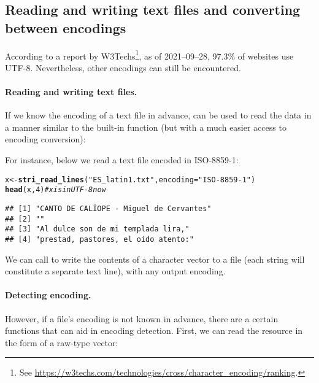 \documentclass[nojss]{jss}\usepackage[]{graphicx}\usepackage[]{xcolor}
\makeatletter
\newcommand{\hlnum}[1]{\textcolor[rgb]{0.686,0.059,0.569}{#1}}%
\newcommand{\hlstr}[1]{\textcolor[rgb]{0.192,0.494,0.8}{#1}}%
\newcommand{\hlcom}[1]{\textcolor[rgb]{0.678,0.584,0.686}{\textit{#1}}}%
\newcommand{\hlstd}[1]{\textcolor[rgb]{0.345,0.345,0.345}{#1}}%
\newcommand{\hlkwb}[1]{\textcolor[rgb]{0.69,0.353,0.396}{#1}}%
\newcommand{\hlkwc}[1]{\textcolor[rgb]{0.333,0.667,0.333}{#1}}%
\newcommand{\hlkwd}[1]{\textcolor[rgb]{0.737,0.353,0.396}{\textbf{#1}}}%
\newenvironment{kframe}{%
 \def\at@end@of@kframe{}%
 \ifinner\ifhmode%
  \def\at@end@of@kframe{\end{minipage}}%
  \begin{minipage}{\columnwidth}%
 \fi\fi%
 \def\FrameCommand##1{\hskip\@totalleftmargin \hskip-\fboxsep
 \colorbox{shadecolor}{##1}\hskip-\fboxsep
     \hskip-\linewidth \hskip-\@totalleftmargin \hskip\columnwidth}%
 \MakeFramed {\advance\hsize-\width
   \@totalleftmargin\z@ \linewidth\hsize
   \@setminipage}}%
 {\par\unskip\endMakeFramed%
 \at@end@of@kframe}
\newenvironment{knitrout}{}{} %
\makeatother
\begin{document}
\subsection{Reading and writing text files and converting between encodings}\label{Sec:read_lines}

According to a report by W3Techs\footnote{See
\url{https://w3techs.com/technologies/cross/character_encoding/ranking}.},
as of 2021--09--28, 97.3\% of websites use UTF-8.
Nevertheless, other encodings can still be encountered.

\paragraph{Reading and writing text files.}
If we know the encoding of a text file  in advance,
 can be used to read
the data in a manner similar to the built-in  function
(but with a much easier access to encoding conversion):

For instance, below we read a text file encoded in ISO-8859-1:

\begin{knitrout}
\color{fgcolor}\begin{kframe}
\begin{alltt}
\hlstd{x} \hlkwb{<-} \hlkwd{stri_read_lines}\hlstd{(}\hlstr{"ES_latin1.txt"}\hlstd{,} \hlkwc{encoding}\hlstd{=}\hlstr{"ISO-8859-1"}\hlstd{)}
\hlkwd{head}\hlstd{(x,} \hlnum{4}\hlstd{)}  \hlcom{# x is in UTF-8 now}
\end{alltt}
\begin{verbatim}
## [1] "CANTO DE CALÍOPE - Miguel de Cervantes"
## [2] ""                                      
## [3] "Al dulce son de mi templada lira,"     
## [4] "prestad, pastores, el oído atento:"
\end{verbatim}
\end{kframe}
\end{knitrout}


We can call  to write the contents
of a character vector to a file (each string will
constitute a separate text line), with any output encoding.




\paragraph{Detecting encoding.}
However, if a file's encoding is not known in advance, there are
a certain functions that can aid in encoding detection.
First, we can read the resource in the form of a raw-type vector:
\end{document}
